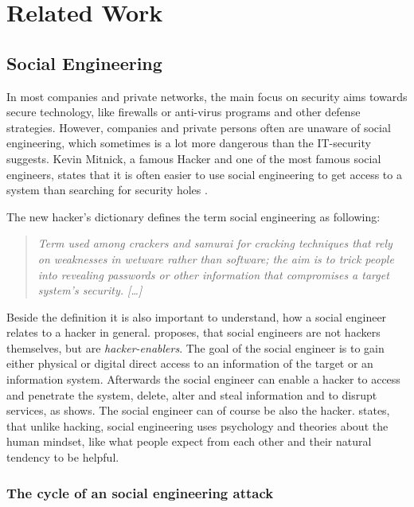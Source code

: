 \chapter{Related Work}
\label{chapter:relatedwork}

\section{Social Engineering}

In most companies and private networks, the main focus on security aims towards
secure technology, like firewalls or anti-virus programs and other defense
strategies. However, companies and private persons often are unaware of social
engineering, which sometimes is a lot more dangerous than the IT-security
suggests. Kevin Mitnick, a famous Hacker and one of the most famous social
engineers, states that it is often easier to use social engineering to get
access to a system than searching for security holes \cite{mitnick2003}.

The new hacker's dictionary \cite{raymond1996} defines the term social engineering as
following:
\begin{quote}
\textit{
\glqq{}Term used among crackers and samurai for cracking techniques that rely on
weaknesses in wetware rather than software; the aim is to trick people into
revealing passwords or other information that compromises a target system's
security. [\dots]\grqq{}}
\end{quote}

Beside the definition it is also important to understand, how a social engineer
relates to a hacker in general. \cite{thornburgh2004} proposes, that social
engineers are not hackers themselves, but are \textit{hacker-enablers}.  The
goal of the social engineer is to gain either physical or digital direct access
to an information of the target or an information system.  Afterwards the
social engineer can enable a hacker to access and penetrate the system, delete,
alter and steal information and to disrupt services, as \cite{thornburgh2004}
shows. The social engineer can of course be also the hacker. \cite{jones2004}
states, that unlike hacking, social engineering uses psychology and theories
about the human mindset, like what people expect from each other and their
natural tendency to be helpful.

\subsection{The cycle of an social engineering attack}

